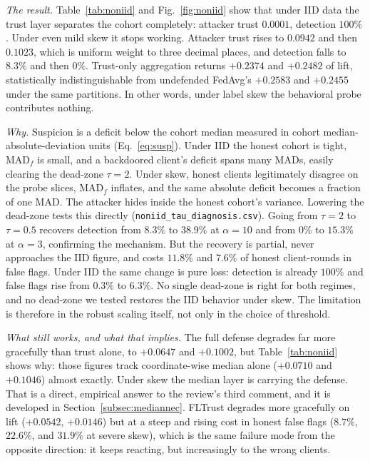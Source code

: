 \documentclass[journal]{IEEEtran}
\begin{document}
\textit{The result.} Table~\ref{tab:noniid} and Fig.~\ref{fig:noniid} show that under IID data the trust layer separates the cohort completely: attacker trust $0.0001$, detection $100\%$. Under even mild skew it stops working. Attacker trust rises to $0.0942$ and then $0.1023$, which is uniform weight to three decimal places, and detection falls to $8.3\%$ and then $0\%$. Trust-only aggregation returns $+0.2374$ and $+0.2482$ of lift, statistically indistinguishable from undefended FedAvg's $+0.2583$ and $+0.2455$ under the same partitions. In other words, under label skew the behavioral probe contributes nothing.

\textit{Why.} Suspicion is a deficit below the cohort median measured in cohort median-absolute-deviation units (Eq.~\ref{eq:susp}). Under IID the honest cohort is tight, $\mathrm{MAD}_f$ is small, and a backdoored client's deficit spans many MADs, easily clearing the dead-zone $\tau = 2$. Under skew, honest clients legitimately disagree on the probe slices, $\mathrm{MAD}_f$ inflates, and the same absolute deficit becomes a fraction of one MAD. The attacker hides inside the honest cohort's variance. Lowering the dead-zone tests this directly (\texttt{noniid\_tau\_diagnosis.csv}). Going from $\tau=2$ to $\tau=0.5$ recovers detection from $8.3\%$ to $38.9\%$ at $\alpha = 10$ and from $0\%$ to $15.3\%$ at $\alpha = 3$, confirming the mechanism. But the recovery is partial, never approaches the IID figure, and costs $11.8\%$ and $7.6\%$ of honest client-rounds in false flags. Under IID the same change is pure loss: detection is already $100\%$ and false flags rise from $0.3\%$ to $6.3\%$. No single dead-zone is right for both regimes, and no dead-zone we tested restores the IID behavior under skew. The limitation is therefore in the robust scaling itself, not only in the choice of threshold.

\textit{What still works, and what that implies.} The full defense degrades far more gracefully than trust alone, to $+0.0647$ and $+0.1002$, but Table~\ref{tab:noniid} shows why: those figures track coordinate-wise median alone ($+0.0710$ and $+0.1046$) almost exactly. Under skew the median layer is carrying the defense. That is a direct, empirical answer to the review's third comment, and it is developed in Section~\ref{subsec:mediannec}. FLTrust degrades more gracefully on lift ($+0.0542$, $+0.0146$) but at a steep and rising cost in honest false flags ($8.7\%$, $22.6\%$, and $31.9\%$ at severe skew), which is the same failure mode from the opposite direction: it keeps reacting, but increasingly to the wrong clients.
\end{document}
